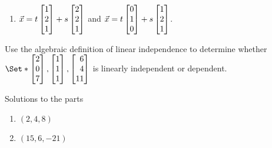 \begin{exercises}
\begin{problist}
\begin{enumerate}
			\item $\vec x = t\mat{1\\2\\1} + s\mat{2\\2\\1}$ and
						$\vec x = t\mat{0\\1\\0} + s\mat{1\\2\\1}$.
		\end{enumerate}
		\prob
		Use the algebraic definition of linear independence to determine whether
		$\Set*{\mat{2\\0\\7},\mat{1\\1\\1},\mat{6\\4\\11}}$ is linearly independent
		or dependent.

		\begin{solution}
		Solutions to the parts
			\begin{enumerate}
				\item   $(2,4,8)$
				\item   $(15,6,-21)$
			\end{enumerate}
		\end{solution}

	\end{problist}
\end{exercises}
